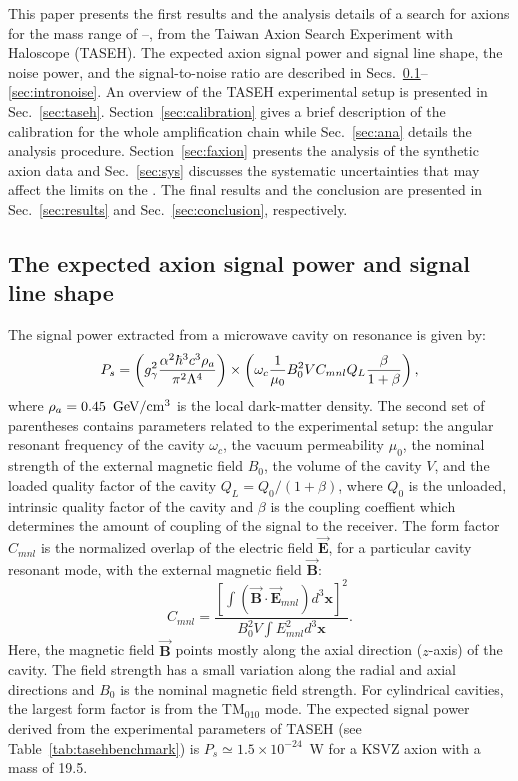 This paper presents the first results and the analysis 
details of a search for axions for the mass range of \mlo--\mhi\muevcc, 
from the Taiwan Axion Search Experiment with Haloscope (TASEH). 
The expected axion signal power and signal line shape, the noise power, 
and the signal-to-noise ratio are described in 
Secs.~\ref{sec:introsignal}--\ref{sec:intronoise}. An overview 
of the TASEH experimental setup is presented in Sec.~\ref{sec:taseh}. 
Section~\ref{sec:calibration} gives a brief 
description of the calibration for the whole amplification chain 
while Sec.~\ref{sec:ana} details the analysis procedure.  
Section~\ref{sec:faxion} presents the analysis of the 
synthetic axion 
data and Sec.~\ref{sec:sys} discusses the systematic 
uncertainties that may affect the limits on the \gagg. 
The final results and the conclusion are presented in 
Sec.~\ref{sec:results} and Sec.~\ref{sec:conclusion}, 
respectively. 


\subsection{The expected axion signal power and signal line shape}
\label{sec:introsignal}

The signal power extracted from a microwave cavity on resonance is given 
by:
\begin{equation}
P_s = \left(g_{\gamma}^2\frac{\alpha^2\hbar^3c^3\rho_a}{\pi^2\Lambda^4}\right)\times
\left(\omega_c\frac{1}{\mu_0}B_0^2VC_{mnl}Q_L\frac{\beta}{1+\beta}\right),
\label{eq:ps}
\end{equation}
where $\rho_a=0.45~\,\text{Ge\hspace{-.08em}V}/\mathrm{cm}^3$ is the local dark-matter density. 
The second set of parentheses contains parameters related to the experimental 
setup: the angular resonant frequency of the cavity $\omega_c$, 
the vacuum permeability $\mu_0$, the nominal strength of the external magnetic 
field $B_0$, the volume of the cavity $V$, and the loaded quality factor of the 
cavity 
\(Q_L=Q_0/(1+\beta)\), where $Q_0$ is the unloaded, intrinsic quality factor 
of the cavity and $\beta$ is the coupling coeffient which determines the amount 
of coupling of the signal to the receiver. The form factor $C_{mnl}$ is the 
normalized overlap of the electric field 
$\vec{\bm{E}}$, for a particular cavity resonant mode, with the external magnetic 
field $\vec{\bm{B}}$:
\begin{equation}
  C_{mnl} = \frac{\left[\int\left( \vec{\bm{B}}\cdot\vec{\bm{E}}_{mnl}\right) d^3\bm{x}\right]^2}{B_0^2V\int E_{mnl}^2 d^3\bm{x}}.
\label{eq:formfactor} 
\end{equation} 
Here, the magnetic field $\vec{\bm{B}}$ points mostly along the axial 
direction ($z$-axis) of the cavity. 
The field strength has a small variation along the radial and axial directions and 
$B_0$ is the nominal magnetic field strength. 
For cylindrical cavities, the largest form factor is from the 
TM$_{010}$ mode. The expected signal power derived from the experimental 
parameters of TASEH (see Table~\ref{tab:tasehbenchmark}) 
is $P_s\simeq 1.5\times10^{-24}$~W for a KSVZ axion with a 
mass of 19.5\muevcc. 

